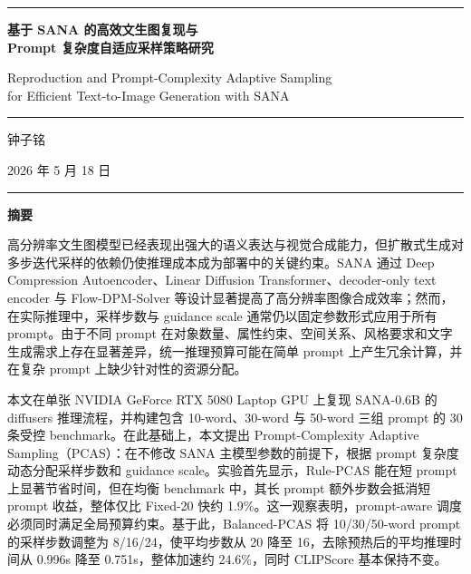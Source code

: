 \documentclass[UTF8,zihao=-4,fontset=fandol]{ctexart}
\newcommand{\clipscore}{\textrm{CLIPScore}}
\begin{document}
\begin{titlepage}
\thispagestyle{empty}
\vspace*{1.1cm}
\begin{center}
\rule{0.86\linewidth}{0.5pt}

\vspace*{4.2cm}
{\fontsize{24pt}{34pt}\selectfont\bfseries
基于 SANA 的高效文生图复现与\\
Prompt 复杂度自适应采样策略研究\par}

\vspace{0.9cm}
{\large
Reproduction and Prompt-Complexity Adaptive Sampling\\
for Efficient Text-to-Image Generation with SANA\par}

\vspace{1.1cm}
\rule{0.72\linewidth}{0.45pt}

\vspace{2.2cm}
{\Large 钟子铭\par}

\vfill
{\Large 2026 年 5 月 18 日\par}

\vspace*{1.2cm}
\rule{0.86\linewidth}{0.5pt}
\end{center}
\end{titlepage}

\clearpage
\pagestyle{plain}
\setcounter{page}{1}

\begin{center}
{\bfseries 摘要}
\end{center}
\vspace{1.2em}

高分辨率文生图模型已经表现出强大的语义表达与视觉合成能力，但扩散式生成对多步迭代采样的依赖仍使推理成本成为部署中的关键约束。SANA 通过 Deep Compression Autoencoder、Linear Diffusion Transformer、decoder-only text encoder 与 Flow-DPM-Solver 等设计显著提高了高分辨率图像合成效率；然而，在实际推理中，采样步数与 guidance scale 通常仍以固定参数形式应用于所有 prompt。由于不同 prompt 在对象数量、属性约束、空间关系、风格要求和文字生成需求上存在显著差异，统一推理预算可能在简单 prompt 上产生冗余计算，并在复杂 prompt 上缺少针对性的资源分配。

本文在单张 NVIDIA GeForce RTX 5080 Laptop GPU 上复现 SANA-0.6B 的 diffusers 推理流程，并构建包含 10-word、30-word 与 50-word 三组 prompt 的 30 条受控 benchmark。在此基础上，本文提出 Prompt-Complexity Adaptive Sampling（PCAS）：在不修改 SANA 主模型参数的前提下，根据 prompt 复杂度动态分配采样步数和 guidance scale。实验首先显示，Rule-PCAS 能在短 prompt 上显著节省时间，但在均衡 benchmark 中，其长 prompt 额外步数会抵消短 prompt 收益，整体仅比 Fixed-20 快约 1.9\%。这一观察表明，prompt-aware 调度必须同时满足全局预算约束。基于此，Balanced-PCAS 将 10/30/50-word prompt 的采样步数调整为 8/16/24，使平均步数从 20 降至 16，去除预热后的平均推理时间从 0.996s 降至 0.751s，整体加速约 24.6\%，同时 \clipscore{} 基本保持不变。
\end{document}

